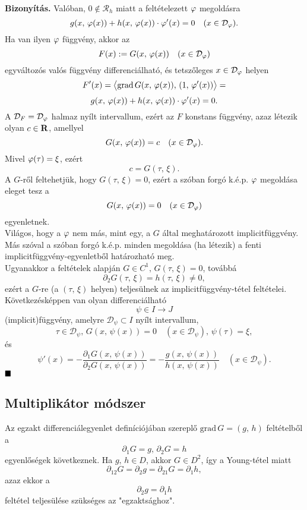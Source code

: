 \textbf{Bizonyítás.} Valóban, $0 \not \in \mathcal{R}_h$ miatt a feltételezett $\varphi$ megoldásra
\[
	g(x, \, \varphi(x)) + h(x, \, \varphi(x)) \cdot \varphi'(x) = 0 \quad (x \in \mathcal{D}_\varphi).
\]
Ha van ilyen $\varphi$ függvény, akkor az
\[
	F(x) := G(x, \, \varphi(x)) \quad (x \in \mathcal{D}_\varphi)
\]
egyváltozós valós függvény differenciálható, és tetszőleges $x \in \mathcal{D}_\varphi$ helyen
\[
	F'(x) = \big\langle \text{grad} \, G(x, \, \varphi(x)), \, (1, \, \varphi'(x)) \big\rangle =
\]
\[
	g(x, \, \varphi(x)) + h(x, \, \varphi(x)) \cdot \varphi'(x) = 0.
\]
A $\mathcal{D}_F = \mathcal{D}_\varphi$ halmaz nyílt intervallum, ezért az $F$ konstans függvény, azaz létezik olyan $c \in \mathbf{R}$, amellyel
\[
	G(x, \, \varphi(x)) = c \quad (x \in \mathcal{D}_\varphi).
\]
Mivel $\varphi(\tau) = \xi$, ezért
\[
	c = G(\tau, \, \xi).
\]
A $G$-ről feltehetjük, hogy $G(\tau, \, \xi) = 0$, ezért a szóban forgó k.é.p. $\varphi$ megoldása eleget tesz a 
\[
	G(x, \, \varphi(x)) = 0 \quad (x \in \mathcal{D}_\varphi)
\]
egyenletnek.\\

Világos, hogy a $\varphi$ nem más, mint egy, a $G$ által meghatározott implicitfüggvény. Más szóval a szóban forgó k.é.p. minden megoldása (ha létezik) a fenti implicitfüggvény-egyenletből határozható meg.\\

Ugyanakkor a feltételek alapján $G \in C^1, \, G(\tau, \, \xi) = 0$, továbbá
\[
	\partial_2G(\tau, \, \xi) = h(\tau, \, \xi) \neq 0,
\]
ezért a $G$-re (a $(\tau, \, \xi)$ helyen) teljesülnek az implicitfüggvény-tétel feltételei. Következésképpen van olyan differenciálható
\[
	\psi \in I \to J
\]
(implicit)függvény, amelyre $\mathcal{D}_\psi \subset I$ nyílt intervallum,
\[
	\tau \in \mathcal{D}_\psi, \, G(x, \, \psi(x)) = 0 \quad (x \in \mathcal{D}_\psi), \, \psi(\tau) = \xi,
\]
és
\[
	\psi'(x) = - \frac{\partial_1G(x, \, \psi(x))}{\partial_2G(x, \, \psi(x))} = - \frac{g(x, \, \psi(x))}{h(x, \, \psi(x))} \quad (x \in \mathcal{D}_\psi).
\]
$\hfill \blacksquare$

\subsection{Multiplikátor módszer}

Az egzakt differenciálegyenlet definíciójában szereplő $\text{grad} \, G = (g, \, h)$ feltételből a
\[
	\partial_1 G = g, \, \partial_2 G = h
\]
egyenlőségek következnek. Ha $g, \, h \in D$, akkor $G \in D^2$, így a Young-tétel miatt
\[
	\partial_{12}G = \partial_2 g = \partial_{21}G = \partial_1 h,
\]
azaz ekkor a
\[
	\partial_2 g = \partial_1 h
\]
feltétel teljesülése szükséges az "egzaktsághoz".\\

